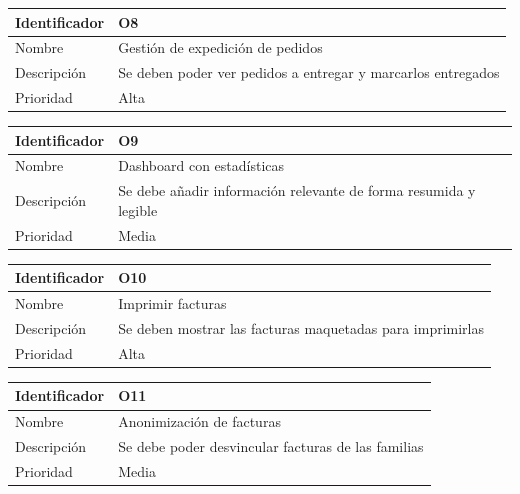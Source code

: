 \vspace{1em}
\par
\begin{tabular}{||p{3cm}|p{11cm}||} 
\hline
Identificador & O8 \\ [0.5ex] 
\hline\hline
Nombre & Gestión de expedición de pedidos \\ 
\hline
Descripción & Se deben poder ver pedidos a entregar y marcarlos entregados \\
\hline
Prioridad & Alta \\ [1ex] 
\hline
\end{tabular}


\vspace{1em}
\par
\begin{tabular}{||p{3cm}|p{11cm}||} 
\hline
Identificador & O9 \\ [0.5ex] 
\hline\hline
Nombre & Dashboard con estadísticas \\ 
\hline
Descripción & Se debe añadir información relevante de forma resumida y legible \\
\hline
Prioridad & Media \\ [1ex] 
\hline
\end{tabular}


\vspace{1em}
\par
\begin{tabular}{||p{3cm}|p{11cm}||} 
\hline
Identificador & O10 \\ [0.5ex] 
\hline\hline
Nombre & Imprimir facturas \\ 
\hline
Descripción & Se deben mostrar las facturas maquetadas para imprimirlas \\
\hline
Prioridad & Alta \\ [1ex] 
\hline
\end{tabular}


\vspace{1em}
\par
\begin{tabular}{||p{3cm}|p{11cm}||} 
\hline
Identificador & O11 \\ [0.5ex] 
\hline\hline
Nombre & Anonimización de facturas \\ 
\hline
Descripción & Se debe poder desvincular facturas de las familias \\
\hline
Prioridad & Media \\ [1ex] 
\hline
\end{tabular}


